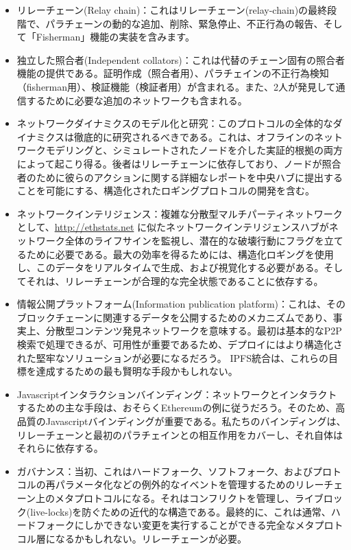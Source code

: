 \begin{itemize}
\item
  リレーチェーン(Relay
  chain)：これはリレーチェーン(relay-chain)の最終段階で、パラチェーンの動的な追加、削除、緊急停止、不正行為の報告、そして「Fisherman」機能の実装を含みます。
\item
  独立した照合者(Independent
  collators)：これは代替のチェーン固有の照合者機能の提供である。証明作成（照合者用）、パラチェインの不正行為検知（fisherman用）、検証機能（検証者用）が含まれる。また、2人が発見して通信するために必要な追加のネットワークも含まれる。
\item
  ネットワークダイナミクスのモデル化と研究：このプロトコルの全体的なダイナミクスは徹底的に研究されるべきである。これは、オフラインのネットワークモデリングと、シミュレートされたノードを介した実証的根拠の両方によって起こり得る。後者はリレーチェーンに依存しており、ノードが照合者のために彼らのアクションに関する詳細なレポートを中央ハブに提出することを可能にする、構造化されたロギングプロトコルの開発を含む。
\item
  ネットワークインテリジェンス：複雑な分散型マルチパーティネットワークとして、\url{http://ethstats.net}
  に似たネットワークインテリジェンスハブがネットワーク全体のライフサインを監視し、潜在的な破壊行動にフラグを立てるために必要である。最大の効率を得るためには、構造化ロギングを使用し、このデータをリアルタイムで生成、および視覚化する必要がある。そしてそれは、リレーチェーンが合理的な完全状態であることに依存する。
\item
  情報公開プラットフォーム(Information publication
  platform)：これは、そのブロックチェーンに関連するデータを公開するためのメカニズムであり、事実上、分散型コンテンツ発見ネットワークを意味する。最初は基本的なP2P検索で処理できるが、可用性が重要であるため、デプロイにはより構造化された堅牢なソリューションが必要になるだろう。
  IPFS統合は、これらの目標を達成するための最も賢明な手段かもしれない。
\item
  Javascriptインタラクションバインディング：ネットワークとインタラクトするための主な手段は、おそらくEthereumの例に従うだろう。そのため、高品質のJavascriptバインディングが重要である。私たちのバインディングは、リレーチェーンと最初のパラチェインとの相互作用をカバーし、それ自体はそれらに依存する。
\item
  ガバナンス：当初、これはハードフォーク、ソフトフォーク、およびプロトコルの再パラメータ化などの例外的なイベントを管理するためのリレーチェーン上のメタプロトコルになる。それはコンフリクトを管理し、ライブロック(live-locks)を防ぐための近代的な構造である。最終的に、これは通常、ハードフォークにしかできない変更を実行することができる完全なメタプロトコル層になるかもしれない。リレーチェーンが必要。

\end{itemize}
